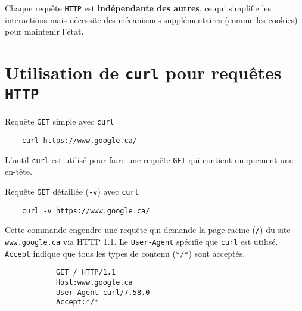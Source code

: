\documentclass[a4paper]{report}
\begin{document}
    \begin{note}{}{}
        Chaque requête \texttt{HTTP}  est \textbf{indépendante des autres}, 
        ce qui simplifie les interactions mais nécessite des mécanismes 
        supplémentaires (comme les cookies) pour maintenir l'état.
    \end{note}



    \section{Utilisation de \texttt{curl} pour requêtes \texttt{HTTP}  }

    \begin{EExample}{Requête \texttt{GET} simple avec \texttt{curl}}{}
        \begin{lstlisting}
    curl https://www.google.ca/
        \end{lstlisting}
        L'outil \texttt{curl} est utilisé pour faire une requête \texttt{GET} qui contient 
        uniquement une en-tête.
        \begin{center}
            \hyperlink{Requête simple avec curl}{
            }
        \end{center}
    \end{EExample}

    \begin{EExample}{Requête \texttt{GET} détaillée (\texttt{-v}) avec \texttt{curl}}{}
        \begin{lstlisting}
    curl -v https://www.google.ca/
        \end{lstlisting}
        Cette commande engendre une requête qui 
        demande la page racine (\texttt{/}) du site \texttt{www.google.ca} via HTTP 1.1.
        Le \texttt{User-Agent} spécifie que \texttt{curl} est utilisé. \texttt{Accept} indique que 
        tous les types de contenu (\texttt{*/*}) sont acceptés.
        \begin{lstlisting}
            GET / HTTP/1.1
            Host:www.google.ca 
            User-Agent curl/7.58.0 
            Accept:*/*
        \end{lstlisting}
        \begin{center}
            \hyperlink{Requête détaillée avec curl}{
            }
        \end{center}
    \end{EExample}
\end{document}
